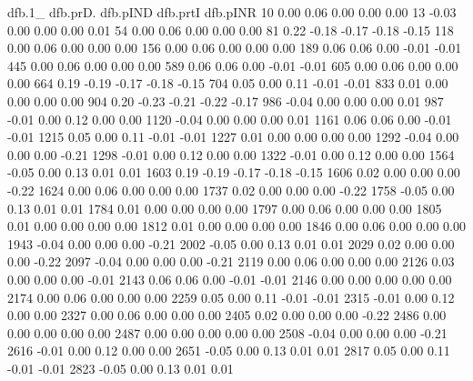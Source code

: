 \begin{Schunk}
\begin{Soutput}
     dfb.1_ dfb.prD. dfb.pIND dfb.prtI dfb.pINR
10    0.00   0.06     0.00     0.00     0.00   
13   -0.03   0.00     0.00     0.00     0.01   
54    0.00   0.06     0.00     0.00     0.00   
81    0.22  -0.18    -0.17    -0.18    -0.15   
118   0.00   0.06     0.00     0.00     0.00   
156   0.00   0.06     0.00     0.00     0.00   
189   0.06   0.06     0.00    -0.01    -0.01   
445   0.00   0.06     0.00     0.00     0.00   
589   0.06   0.06     0.00    -0.01    -0.01   
605   0.00   0.06     0.00     0.00     0.00   
664   0.19  -0.19    -0.17    -0.18    -0.15   
704   0.05   0.00     0.11    -0.01    -0.01   
833   0.01   0.00     0.00     0.00     0.00   
904   0.20  -0.23    -0.21    -0.22    -0.17   
986  -0.04   0.00     0.00     0.00     0.01   
987  -0.01   0.00     0.12     0.00     0.00   
1120 -0.04   0.00     0.00     0.00     0.01   
1161  0.06   0.06     0.00    -0.01    -0.01   
1215  0.05   0.00     0.11    -0.01    -0.01   
1227  0.01   0.00     0.00     0.00     0.00   
1292 -0.04   0.00     0.00     0.00    -0.21   
1298 -0.01   0.00     0.12     0.00     0.00   
1322 -0.01   0.00     0.12     0.00     0.00   
1564 -0.05   0.00     0.13     0.01     0.01   
1603  0.19  -0.19    -0.17    -0.18    -0.15   
1606  0.02   0.00     0.00     0.00    -0.22   
1624  0.00   0.06     0.00     0.00     0.00   
1737  0.02   0.00     0.00     0.00    -0.22   
1758 -0.05   0.00     0.13     0.01     0.01   
1784  0.01   0.00     0.00     0.00     0.00   
1797  0.00   0.06     0.00     0.00     0.00   
1805  0.01   0.00     0.00     0.00     0.00   
1812  0.01   0.00     0.00     0.00     0.00   
1846  0.00   0.06     0.00     0.00     0.00   
1943 -0.04   0.00     0.00     0.00    -0.21   
2002 -0.05   0.00     0.13     0.01     0.01   
2029  0.02   0.00     0.00     0.00    -0.22   
2097 -0.04   0.00     0.00     0.00    -0.21   
2119  0.00   0.06     0.00     0.00     0.00   
2126  0.03   0.00     0.00     0.00    -0.01   
2143  0.06   0.06     0.00    -0.01    -0.01   
2146  0.00   0.00     0.00     0.00     0.00   
2174  0.00   0.06     0.00     0.00     0.00   
2259  0.05   0.00     0.11    -0.01    -0.01   
2315 -0.01   0.00     0.12     0.00     0.00   
2327  0.00   0.06     0.00     0.00     0.00   
2405  0.02   0.00     0.00     0.00    -0.22   
2486  0.00   0.00     0.00     0.00     0.00   
2487  0.00   0.00     0.00     0.00     0.00   
2508 -0.04   0.00     0.00     0.00    -0.21   
2616 -0.01   0.00     0.12     0.00     0.00   
2651 -0.05   0.00     0.13     0.01     0.01   
2817  0.05   0.00     0.11    -0.01    -0.01   
2823 -0.05   0.00     0.13     0.01     0.01   

\end{Soutput}
\end{Schunk}
